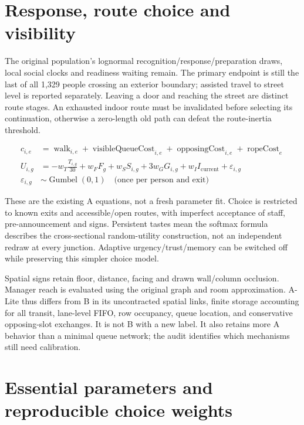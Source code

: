 \documentclass[11pt,a4paper]{article}
\begin{document}
\section{Response, route choice and visibility}

The original population's lognormal recognition/response/preparation draws, local social clocks and readiness waiting remain. The primary endpoint is still the last of all 1,329 people crossing an exterior boundary; assisted travel to street level is reported separately. Leaving a door and reaching the street are distinct route stages. An exhausted indoor route must be invalidated before selecting its continuation, otherwise a zero-length old path can defeat the route-inertia threshold.


\begin{equation}
\begin{aligned}
c_{i,e}&=\operatorname{walk}_{i,e}+\operatorname{visibleQueueCost}_{i,e}+\operatorname{opposingCost}_{i,e}+\operatorname{ropeCost}_e \\
U_{i,g}&=-w_T\frac{T_{i,g}}{30}+w_FF_g+w_SS_{i,g}+3w_GG_{i,g}+w_II_{\mathrm{current}}+\varepsilon_{i,g} \\
\varepsilon_{i,g}&\sim\operatorname{Gumbel}(0,1)\quad\text{(once per person and exit)}
\end{aligned}
\tag{L5}\label{eq:L5}
\end{equation}

These are the existing A equations, not a fresh parameter fit. Choice is restricted to known exits and accessible/open routes, with imperfect acceptance of staff, pre-announcement and signs. Persistent tastes mean the softmax formula describes the cross-sectional random-utility construction, not an independent redraw at every junction. Adaptive urgency/trust/memory can be switched off while preserving this simpler choice model.


Spatial signs retain floor, distance, facing and drawn wall/column occlusion. Manager reach is evaluated using the original graph and room approximation. A-Lite thus differs from B in its uncontracted spatial links, finite storage accounting for all transit, lane-level FIFO, row occupancy, queue location, and conservative opposing-slot exchanges. It is not B with a new label. It also retains more A behavior than a minimal queue network; the audit identifies which mechanisms still need calibration.


\section{Essential parameters and reproducible choice weights}
\end{document}
